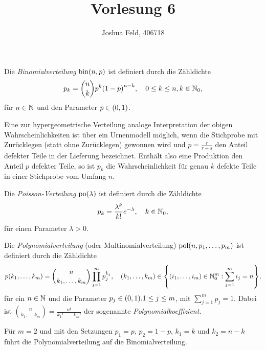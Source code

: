 \documentclass{lecture}
\institute{Institut für Statistik und Wirtschaftsmathematik}
\title{Vorlesung 6}
\author{Joshua Feld, 406718}
\begin{document}
    \maketitle


    \begin{definition}
        Die \emph{Binomialverteilung} \(\bin\parentheses*{n, p}\) ist definiert durch die Zähldichte
        \[
            p_k = \binom{n}{k}p^k \parentheses*{1 - p}^{n - k}, \quad 0 \le k \le n, k \in \N_0,
        \]
        für \(n \in \N\) und den Parameter \(p \in \parentheses*{0, 1}\).
    \end{definition}

    Eine zur hypergeometrische Verteilung analoge Interpretation der obigen Wahrscheinlichkeiten ist über ein Urnenmodell möglich, wenn die Stichprobe mit Zurücklegen (statt ohne Zurücklegen) gewonnen wird und \(p = \frac{r}{r + s}\) den Anteil defekter Teile in der Lieferung bezeichnet.
    Enthält also eine Produktion den Anteil \(p\) defekter Teile, so ist \(p_k\) die Wahrscheinlichkeit für genau \(k\) defekte Teile in einer Stichprobe vom Umfang \(n\).

    \begin{definition}
        Die \emph{Poisson-Verteilung} \(\po\parentheses*{\lambda}\) ist definiert durch die Zähldichte
        \[
            p_k = \frac{\lambda^k}{k!}e^{-\lambda}, \quad k \in \N_0,
        \]
        für einen Parameter \(\lambda > 0\).
    \end{definition}

    \begin{definition}
        Die \emph{Polynomialverteilung} (oder Multinomialverteilung) \(\pol\parentheses*{n, p_1, \ldots, p_m}\) ist definiert durch die Zähldichte
        \[
            p\parentheses*{k_1, \ldots, k_m} = \binom{n}{k_1, \ldots, k_m}\prod_{j = 1}^m p_j^{k_j}, \quad \parentheses*{k_1, \ldots, k_m} \in \braces*{\parentheses*{i_1, \ldots, i_m} \in \N_0^m : \sum_{j = 1}^m i_j = n},
        \]
        für ein \(n \in \N\) und die Parameter \(p_j \in \parentheses*{0, 1}. 1 \le j \le m\), mit \(\sum_{j = 1}^m p_j = 1\).
        Dabei ist \(\binom{n}{k_1, \ldots, k_m} = \frac{n!}{k_1! \cdot \ldots \cdot k_m!}\) der sogenannte \emph{Polynomialkoeffizient}.
    \end{definition}

    Für \(m = 2\) und mit den Setzungen \(p_1 = p\), \(p_2 = 1 - p\), \(k_1 = k\) und \(k_2 = n - k\) führt die Polynomialverteilung auf die Binomialverteilung.
\end{document}
